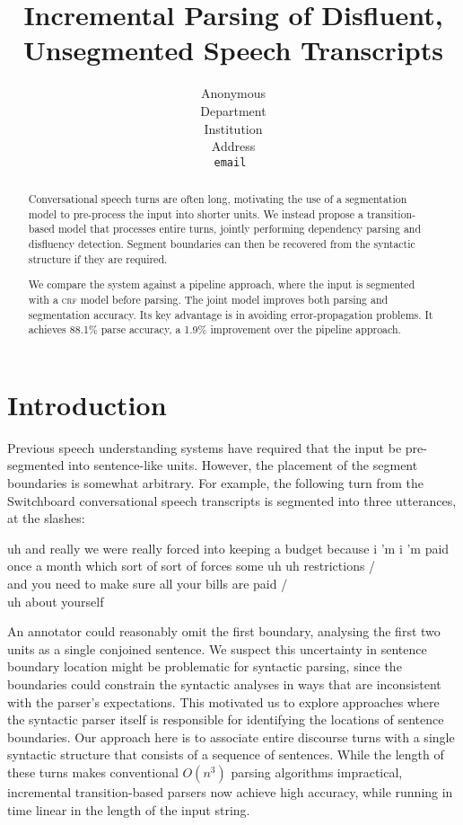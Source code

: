 \documentclass[11pt,letterpaper]{article}
\title{Incremental Parsing of Disfluent, Unsegmented Speech Transcripts}
\author{
	Anonymous\\
  	Department\\
  	Institution\\
  	Address\\
  {\tt \small email }\\
}
\date{}
\begin{document}
\maketitle
\begin{abstract}
Conversational speech turns are often long, motivating the use of a segmentation
model to pre-process the input into shorter units.  We instead propose a
transition-based model that processes entire turns, jointly performing dependency
parsing and disfluency detection.  Segment boundaries can then be recovered
from the syntactic structure if they are required.

We compare the system against a pipeline approach, where the input is segmented
with a \textsc{crf} model before parsing.  The joint model improves both parsing
and segmentation accuracy.
Its key advantage is in avoiding error-propagation problems.  It achieves 88.1\%
parse accuracy, a 1.9\% improvement over the pipeline approach.
\end{abstract}

\section{Introduction}


Previous speech understanding systems have required that the input be
pre-segmented into sentence-like units.  However, the placement of the segment
boundaries is somewhat arbitrary.  For example, the following turn from the
Switchboard conversational speech transcripts is segmented into three utterances,
at the slashes:

\begin{lexample}
\small
uh and really we were really forced into keeping a budget because i 'm i 'm paid
once a month which sort of sort of forces some uh uh restrictions / \\
and you need to make sure all your bills are paid / \\
uh about yourself
\end{lexample}

\noindent An annotator could reasonably omit the first boundary, analysing
the first two units as a single conjoined sentence.  
We suspect this uncertainty in sentence boundary location
might be problematic for syntactic parsing, since the boundaries could
constrain the syntactic analyses in ways that are inconsistent with the parser's
expectations.  This motivated us to explore approaches where the syntactic parser
itself is responsible for identifying the locations of sentence boundaries.  Our
approach here is to associate entire discourse turns with a single syntactic
structure that consists of a sequence of sentences.
While the length of these turns makes conventional $O(n^3)$ parsing algorithms
impractical, incremental transition-based parsers now achieve high accuracy,
while running in time linear in the length of the input string.
\end{document}

